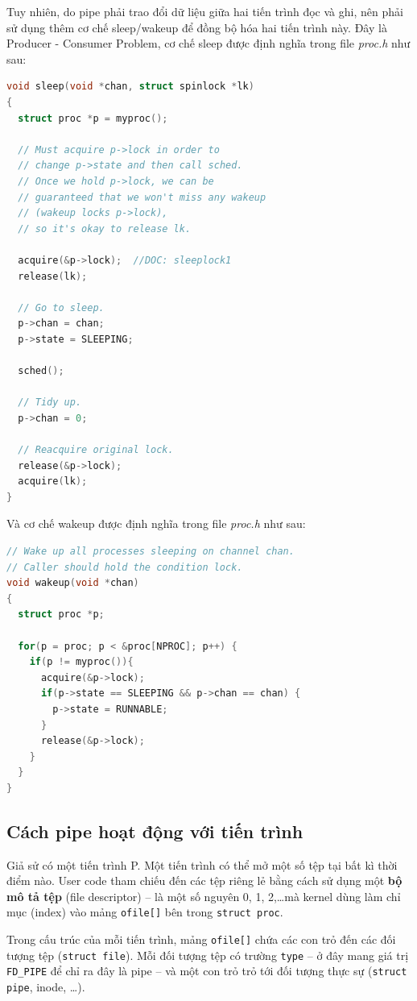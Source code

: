 \documentclass[12pt,a4paper]{article}
\newcommand{\code}[1]{\texttt{#1}}
\begin{document}
Tuy nhiên, do pipe phải trao đổi dữ liệu giữa hai tiến trình đọc và ghi, nên phải sử dụng thêm cơ chế sleep/wakeup để đồng bộ hóa hai tiến trình này. Đây là Producer - Consumer Problem, 
cơ chế sleep được định nghĩa trong file \textit{proc.h} như sau:
\begin{lstlisting}[language=C]
void sleep(void *chan, struct spinlock *lk)
{
  struct proc *p = myproc();
  
  // Must acquire p->lock in order to
  // change p->state and then call sched.
  // Once we hold p->lock, we can be
  // guaranteed that we won't miss any wakeup
  // (wakeup locks p->lock),
  // so it's okay to release lk.

  acquire(&p->lock);  //DOC: sleeplock1
  release(lk);

  // Go to sleep.
  p->chan = chan;
  p->state = SLEEPING;

  sched();

  // Tidy up.
  p->chan = 0;

  // Reacquire original lock.
  release(&p->lock);
  acquire(lk);
}
\end{lstlisting}
Và cơ chế wakeup được định nghĩa trong file \textit{proc.h} như sau:
\begin{lstlisting}[language=C]
// Wake up all processes sleeping on channel chan.
// Caller should hold the condition lock.
void wakeup(void *chan)
{
  struct proc *p;

  for(p = proc; p < &proc[NPROC]; p++) {
    if(p != myproc()){
      acquire(&p->lock);
      if(p->state == SLEEPING && p->chan == chan) {
        p->state = RUNNABLE;
      }
      release(&p->lock);
    }
  }
}
\end{lstlisting}
\subsection{Cách pipe hoạt động với tiến trình}

Giả sử có một tiến trình P. Một tiến trình có thể mở một số tệp tại bất kì thời điểm
nào. User code tham chiếu đến các tệp riêng lẻ bằng cách sử dụng một \textbf{bộ mô tả
tệp} (file descriptor) -- là một số nguyên 0, 1, 2,\ldots mà kernel dùng làm chỉ mục
(index) vào mảng \code{ofile[]} bên trong \code{struct proc}.

Trong cấu trúc của mỗi tiến trình, mảng \code{ofile[]} chứa các con trỏ đến các đối
tượng tệp (\code{struct file}). Mỗi đối tượng tệp có trường \code{type} -- ở đây mang
giá trị \code{FD\_PIPE} để chỉ ra đây là pipe -- và một con trỏ trỏ tới đối tượng
thực sự (\code{struct pipe}, inode, \ldots).
\end{document}
